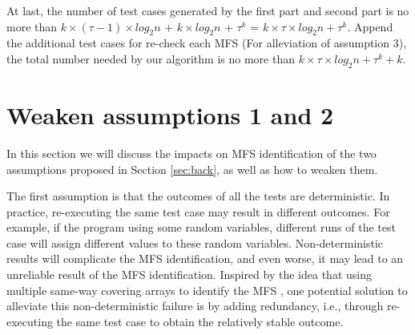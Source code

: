 \documentclass{sig-alternate-05-2015}
\begin{document}
{{{At last, the number of test cases generated by the first part and second part is no more than $k \times (\tau - 1) \times log_{2}n$ + $k \times log_{2}n$ + $\tau^{k} $ =
$k \times \tau \times log_{2}n + \tau^{k} $.  Append the additional test cases for re-check each MFS (For alleviation of assumption 3), the total number needed by our algorithm is no more than $k \times \tau \times log_{2}n + \tau^{k} + k $.




%



\section{Weaken assumptions 1 and 2}
In this section we will discuss the impacts on MFS identification of the two assumptions proposed in Section \ref{sec:back}, as well as how to weaken them.

The first assumption is that the outcomes of all the tests are deterministic. In practice, re-executing the same test case may result in different outcomes. For example, if the program using some random variables, different runs of the test case will assign different
values to these random variables. Non-deterministic results will complicate the MFS identification, and even worse, it may lead to an unreliable result of the MFS identification. Inspired by the idea that using multiple same-way covering arrays to identify the MFS \cite{fouche2009incremental,yilmaz2006covering}, one potential solution to alleviate this non-deterministic failure is by adding redundancy, i.e., through re-executing the same test case to obtain the relatively stable outcome.

}}}
\end{document}
